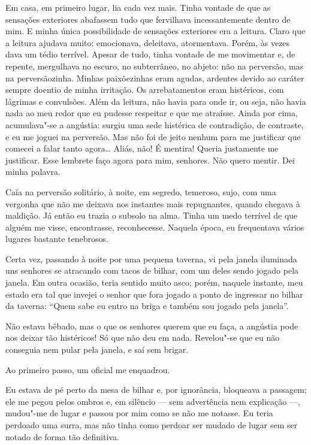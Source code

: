 Em casa, em primeiro lugar, lia cada vez mais. Tinha vontade de que as
sensações exteriores abafassem tudo que fervilhava incessantemente
dentro de mim. E minha única possibilidade de sensações exteriores era a
leitura. Claro que a leitura ajudava muito: emocionava, deleitava,
atormentava. Porém, às vezes dava um tédio terrível. Apesar de tudo,
tinha vontade de me movimentar e, de repente, mergulhava no escuro, no
subterrâneo, no abjeto: não na perversão, mas na perversãozinha. Minhas
paixõezinhas eram agudas, ardentes devido ao caráter sempre doentio de
minha irritação. Os arrebatamentos eram histéricos, com lágrimas e
convulsões. Além da leitura, não havia para onde ir, ou seja, não havia
nada ao meu redor que eu pudesse respeitar e que me atraísse. Ainda por
cima, acumulava"-se a angústia: surgiu uma sede histérica de contradição,
de contraste, e eu me joguei na perversão. Mas não foi de jeito nenhum
para me justificar que comecei a falar tanto agora\ldots{} Aliás, não! É
mentira! Queria justamente me justificar. Esse lembrete faço agora para
mim, senhores. Não quero mentir. Dei minha palavra.

Caía na perversão solitário, à noite, em segredo, temeroso, sujo, com
uma vergonha que não me deixava nos instantes mais repugnantes, quando
chegava à maldição. Já então eu trazia o subsolo na alma. Tinha um medo
terrível de que alguém me visse, encontrasse, reconhecesse. Naquela
época, eu frequentava vários lugares bastante tenebrosos.

Certa vez, passando à noite por uma pequena taverna, vi pela janela
iluminada uns senhores se atracando com tacos de bilhar, com um deles
sendo jogado pela janela. Em outra ocasião, teria sentido muito asco;
porém, naquele instante, meu estado era tal que invejei o senhor que
fora jogado a ponto de ingressar no bilhar da taverna: ``Quem sabe eu
entro na briga e também sou jogado pela janela''.

Não estava bêbado, mas o que os senhores querem que eu faça, a angústia
pode nos deixar tão histéricos! Só que não deu em nada. Revelou"-se que
eu não conseguia nem pular pela janela, e saí sem brigar.

Ao primeiro passo, um oficial me enquadrou.

Eu estava de pé perto da mesa de bilhar e, por ignorância, bloqueava a
passagem; ele me pegou pelos ombros e, em silêncio --- sem advertência
nem explicação ---, mudou"-me de lugar e passou por mim como se não me
notasse. Eu teria perdoado uma surra, mas não tinha como perdoar ser
mudado de lugar sem ser notado de forma tão definitiva.


